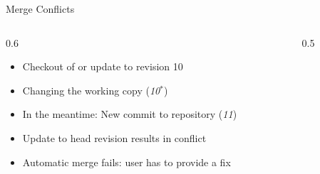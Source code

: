 \begin{frame}[fragile]{Merge Conflicts}
\begin{columns}[T, onlytextwidth]
\begin{column}{0.6\linewidth}
			\begin{example}{}
				\begin{itemize}
					\item<1-> Checkout of or update to revision 10
					\item<2-> Changing the working copy (\emph{10$^*$})
					\item<3-> In the meantime: New commit to repository (\emph{11})
					\item<4-> Update to head revision results in conflict
					\item<4-> Automatic merge fails: user has to provide a fix
				\end{itemize}
			\end{example}
		\end{column}
		\begin{column}{0.5\linewidth}
		\end{column}
	\end{columns}
\end{frame}

